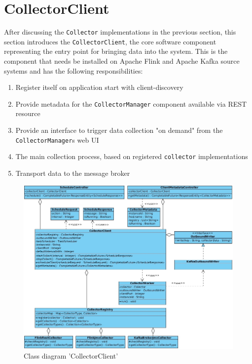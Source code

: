 \section{CollectorClient}
\label{sec:impl-collector-client}

After discussing the \verb|Collector| implementations in the previous section, this section introduces the \verb|CollectorClient|,
the core software component representing the entry point for bringing data into the system. This is the component that needs be
installed on Apache Flink and Apache Kafka source systems and has the following responsibilities:

\begin{enumerate}
    \item Register itself on application start with client-discovery
    \item Provide metadata for the \verb|CollectorManager| component available via REST resource
    \item Provide an interface to trigger data collection "on demand" from the \verb|CollectorManager|s web UI
    \item The main collection process, based on registered \verb|collector| implementations
    \item Transport data to the message broker
\end{enumerate}

\begin{figure}[H]
	\centering
	\includegraphics[width=1.0\textwidth]{../uml/class-collector-client.jpg}
	\caption{Class diagram 'CollectorClient'}
	\label{class-diagram-collector-client}
\end{figure}

